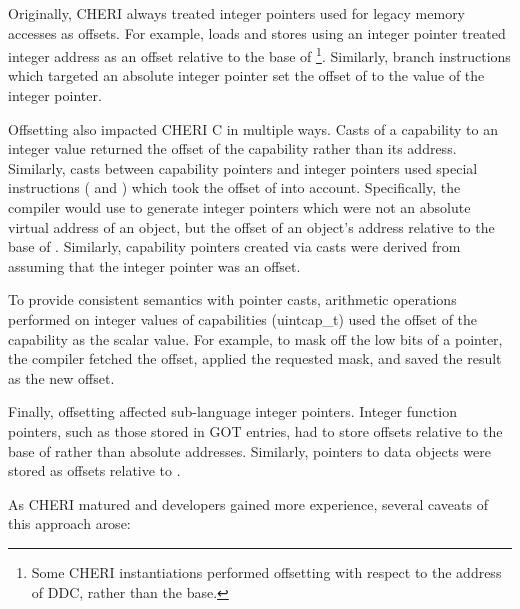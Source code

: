 Originally, CHERI always treated integer pointers used for legacy
memory accesses as offsets.  For example, loads and stores using an
integer pointer treated integer address as an offset relative to the
base of \DDC{}\footnote{Some CHERI instantiations performed offsetting
with respect to the address of DDC, rather than the base.}.
Similarly, branch instructions which targeted an
absolute integer pointer set the offset of \PCC{} to the value of the
integer pointer.

Offsetting also impacted CHERI C in multiple ways.
Casts of a capability to an integer value returned the offset of the
capability rather than its address.  Similarly, casts between
capability pointers and integer pointers used special instructions
( and ) which took the offset of
\DDC{} into account.  Specifically, the compiler would use
 to generate integer pointers which were not an
absolute virtual address of an object, but the offset of an object's
address relative to the base of \DDC{}.  Similarly, capability
pointers created via casts were derived from \DDC{} assuming that the
integer pointer was an offset.

To provide consistent semantics with pointer casts, arithmetic
operations performed on integer values of capabilities (uintcap\_t)
used the offset of the capability as the scalar value.  For example,
to mask off the low bits of a pointer, the compiler fetched the
offset, applied the requested mask, and saved the result as the new
offset.

Finally, offsetting affected sub-language integer pointers.  Integer
function pointers, such as those stored in GOT entries, had to store
offsets relative to the base of \PCC{} rather than absolute addresses.
Similarly, pointers to data objects were stored as offsets relative to
\DDC{}.

As CHERI matured and developers gained more experience, several
caveats of this approach arose:

